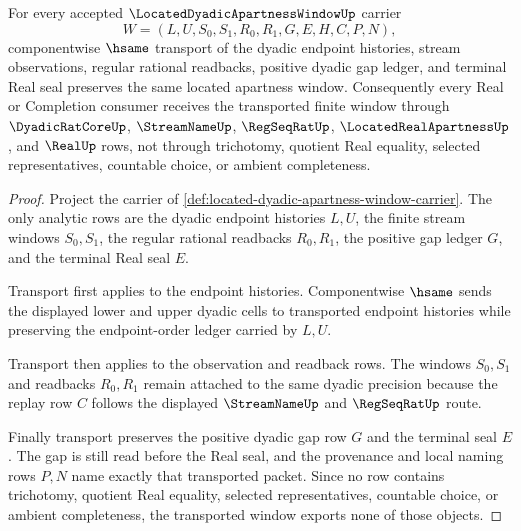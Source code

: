 \begin{theorem}
\label{thm:located-dyadic-apartness-window-stability}
For every accepted $\LocatedDyadicApartnessWindowUp$ carrier
$$
W=(L,U,S_0,S_1,R_0,R_1,G,E,H,C,P,N),
$$
componentwise $\hsame$ transport of the dyadic endpoint histories, stream observations, regular rational readbacks, positive dyadic gap ledger, and terminal Real seal preserves the same located apartness window. Consequently every Real or Completion consumer receives the transported finite window through $\DyadicRatCoreUp$, $\StreamNameUp$, $\RegSeqRatUp$, $\LocatedRealApartnessUp$, and $\RealUp$ rows, not through trichotomy, quotient Real equality, selected representatives, countable choice, or ambient completeness.
\end{theorem}
\begin{proof}
Project the carrier of \autoref{def:located-dyadic-apartness-window-carrier}. The only analytic rows are the dyadic endpoint histories $L,U$, the finite stream windows $S_0,S_1$, the regular rational readbacks $R_0,R_1$, the positive gap ledger $G$, and the terminal Real seal $E$.

Transport first applies to the endpoint histories. Componentwise $\hsame$ sends the displayed lower and upper dyadic cells to transported endpoint histories while preserving the endpoint-order ledger carried by $L,U$.

Transport then applies to the observation and readback rows. The windows $S_0,S_1$ and readbacks $R_0,R_1$ remain attached to the same dyadic precision because the replay row $C$ follows the displayed $\StreamNameUp$ and $\RegSeqRatUp$ route.

Finally transport preserves the positive dyadic gap row $G$ and the terminal seal $E$. The gap is still read before the Real seal, and the provenance and local naming rows $P,N$ name exactly that transported packet. Since no row contains trichotomy, quotient Real equality, selected representatives, countable choice, or ambient completeness, the transported window exports none of those objects.
\end{proof}


